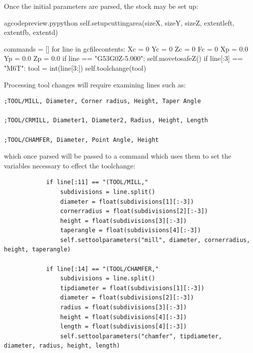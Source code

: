 \documentclass{ltxdoc}
\begin{document}
Once the initial parameters are parsed, the stock may be set up:

\lstset{firstnumber=\thegcpy}
\begin{writecode}{a}{gcodepreview.py}{python}
        self.setupcuttingarea(sizeX, sizeY, sizeZ, extentleft, extentfb, extentd)

        commands = []        
        for line in gcfilecontents:
            Xc = 0
            Yc = 0
            Zc = 0
            Fc = 0
            Xp = 0.0
            Yp = 0.0
            Zp = 0.0
            if line == "G53G0Z-5.000\n":
                 self.movetosafeZ()
            if line[:3] == "M6T":
                tool = int(line[3:])
                self.toolchange(tool)
\end{writecode}
\addtocounter{gcpy}{16}

Processing tool changes will require examining lines such as:

\begin{verbatim}
;TOOL/MILL, Diameter, Corner radius, Height, Taper Angle

;TOOL/CRMILL, Diameter1, Diameter2, Radius, Height, Length

;TOOL/CHAMFER, Diameter, Point Angle, Height
\end{verbatim}

\noindent which once parsed will be passed to a command which uses them to set the variables necessary to effect the toolchange:

\begin{verbatim}
            if line[:11] == "(TOOL/MILL,"
                subdivisions = line.split()
                diameter = float(subdivisions[1][:-3])
                cornerradius = float(subdivisions[2][:-3])
                height = float(subdivisions[3][:-3])
                taperangle = float(subdivisions[4][:-3])
                self.settoolparameters("mill", diameter, cornerradius, height, taperangle)

            if line[:14] == "(TOOL/CHAMFER,"
                subdivisions = line.split()
                tipdiameter = float(subdivisions[1][:-3])
                diameter = float(subdivisions[2][:-3])
                radius = float(subdivisions[3][:-3])
                height = float(subdivisions[4][:-3])
                length = float(subdivisions[4][:-3])
                self.settoolparameters("chamfer", tipdiameter, diameter, radius, height, length)

\end{verbatim}
\end{document}
